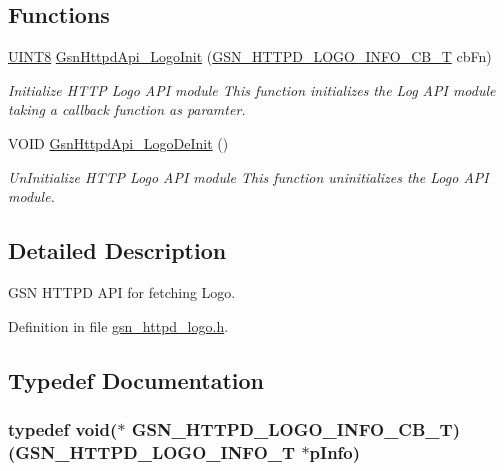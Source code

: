 \subsection*{Functions}
\begin{DoxyCompactItemize}
\item 
\hyperlink{a00660_gab27e9918b538ce9d8ca692479b375b6a}{UINT8} \hyperlink{a00513_a17c748e09c81027d125a8bcec300f662}{GsnHttpdApi\_\-LogoInit} (\hyperlink{a00513_aad62b44c06f9c4abc0073c0388cbe332}{GSN\_\-HTTPD\_\-LOGO\_\-INFO\_\-CB\_\-T} cbFn)
\begin{DoxyCompactList}\small\item\em Initialize HTTP Logo API module This function initializes the Log API module taking a callback function as paramter. \end{DoxyCompactList}\item 
VOID \hyperlink{a00513_a06be6bb9fc1446280b667f8a9cf075b2}{GsnHttpdApi\_\-LogoDeInit} ()
\begin{DoxyCompactList}\small\item\em UnInitialize HTTP Logo API module This function uninitializes the Logo API module. \end{DoxyCompactList}\end{DoxyCompactItemize}


\subsection{Detailed Description}
GSN HTTPD API for fetching Logo. 

Definition in file \hyperlink{a00513_source}{gsn\_\-httpd\_\-logo.h}.



\subsection{Typedef Documentation}
\hypertarget{a00513_aad62b44c06f9c4abc0073c0388cbe332}{
\subsubsection[{GSN\_\-HTTPD\_\-LOGO\_\-INFO\_\-CB\_\-T}]{\setlength{\rightskip}{0pt plus 5cm}typedef void($\ast$ {\bf GSN\_\-HTTPD\_\-LOGO\_\-INFO\_\-CB\_\-T})({\bf GSN\_\-HTTPD\_\-LOGO\_\-INFO\_\-T} $\ast$pInfo)}}
\label{a00513_aad62b44c06f9c4abc0073c0388cbe332}


